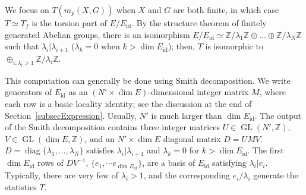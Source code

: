 \documentclass[reprint, amsmath, amssymb, showpacs, floatfix, longbibliography, aps, twocolumn, superscriptaddress, nofootinbib]{revtex4-2}
\newcommand{\ZZ}{{\mathbb Z}}
\theoremstyle{definition}
\begin{document}
We focus on $T(m_p(X,G))$ when $X$ and $G$ are both finite, in which case $T\simeq T_f$ is the torsion part of $E/E_{\operatorname{id}}$. By the structure theorem of finitely generated Abelian groups, there is an isomorphism $E/E_{\operatorname{id}} \simeq \mathbb{Z}/\lambda_1\mathbb{Z} \oplus \dots \oplus \mathbb{Z}/\lambda_N\mathbb{Z}$ such that $\lambda_i|\lambda_{i+1}$ ($\lambda_k=0$ when $k>\dim E_{\operatorname{id}}$); then, $T$ is isomorphic to $\oplus_{i:\lambda_i>1} \mathbb{Z}/\lambda_i\mathbb{Z}$.

This computation can generally be done using Smith decomposition. We write generators of $E_{\operatorname{id}}$ as an $(N'\times \dim E)$-dimensional integer matrix $M$, where each row is a basic locality identity; see the discussion at the end of Section~\ref{subsecExpression}. Usually, $N'$ is much larger than $\dim E_{\operatorname{id}}$. The output of the Smith decomposition contains three integer matrices $U\in \operatorname{GL}(N',\ZZ)$, $V\in \operatorname{GL}(\dim E,\ZZ)$, and an $N'\times \dim E$ diagonal matrix $D = UMV$. $D=\operatorname{diag}\{\lambda_1, \dots, \lambda_N\}$ satisfies $\lambda_i|\lambda_{i+1}$ and $\lambda_k=0$ for $k>\dim E_{\operatorname{id}}$. The first $\dim E_{\operatorname{id}}$ rows of $DV^{-1}$, $\{e_1,\cdots e_{\dim E_{\operatorname{id}}}\}$, are a basis of $E_{\operatorname{id}}$ satisfying $\lambda_i|e_i$. Typically, there are very few of $\lambda_i>1$, and the corresponding $e_i/\lambda_i$ generate the statistics $T$.
\end{document}
